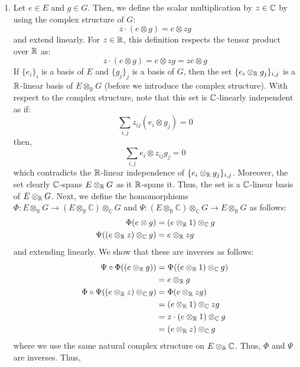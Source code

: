 \documentclass[12pt]{article}
\begin{document}
\begin{solu}
    \bbni
    \begin{enumerate}
        \item Let $e \in E$ and $g \in G$. Then, we define the scalar multiplication by $z \in \mathbb C$ by using the complex structure of $G$: 
        \[ z\cdot (e \otimes g) = e \otimes zg \]
        and extend linearly. For $z \in \mathbb R$, this definition respects the tensor product over $\mathbb R$ as:
        \[ z \cdot (e \otimes g ) = e \otimes zg = ze \otimes g\]
        If $\{e_i\}_i$ is a basis of $E$ and $\{g_j\}_j$ is a basis of $G$, then the set $\{e_i \otimes_\mathbb R g_j\}_{i,j}$ is a $\mathbb R$-linear basis of $E \otimes_{\mathbb{R}} G$ (before we introduce the complex structure). With respect to the complex structure, note that this set is $\mathbb C$-linearly independent as if: 
        \[\sum_{i,j} z_{ij} (e_i \otimes g_j)= 0\]
        then, 
        \[ \sum_{i,j}  e_i \otimes z_{ij}g_j = 0\]
        which contradicts the $\mathbb R$-linear independence of $\{e_i \otimes_\mathbb R g_j\}_{i,j}$. Moreover, the set clearly $\mathbb C$-spans $E \otimes_\mathbb R G$ as it $\mathbb R$-spans it. Thus, the set is a $\mathbb C$-linear basis of $E \otimes_\mathbb R G$. \bbni
        Next, we define the homomorphisms $\Phi: E \otimes_{\mathbb{R}} G \to (E \otimes_{\mathbb{R}} \mathbb{C}) \otimes_{\mathbb{C}} G$ and $\Psi: (E \otimes_{\mathbb{R}} \mathbb{C}) \otimes_{\mathbb{C}} G \to E \otimes_{\mathbb{R}} G$ as follows:
        \begin{align*}
            \Phi(e \otimes g) &= (e \otimes_\mathbb R 1) \otimes_\mathbb C g \\
            \Psi((e \otimes_\mathbb R z) \otimes_\mathbb C g) &= e \otimes_\mathbb R zg
        \end{align*}
        and extending linearly. We show that these are inverses as follows: 
        \begin{align*}
            \Psi \circ \Phi((e \otimes_\mathbb R g)) &= \Psi((e \otimes_\mathbb R 1) \otimes_\mathbb C g) \\
            &= e \otimes_\mathbb R g \\
            \Phi \circ \Psi((e \otimes_\mathbb R z) \otimes_\mathbb C g) &= \Phi(e \otimes_\mathbb R zg) \\
            &= (e \otimes_\mathbb R 1) \otimes_\mathbb C zg \\
            &= z\cdot (e \otimes_\mathbb R 1) \otimes_\mathbb C g \\
            &= (e \otimes_\mathbb R z) \otimes_\mathbb C g
        \end{align*}
        where we use the same natural complex structure on $E \otimes_\mathbb R \mathbb C$. Thus, $\Phi$ and $\Psi$ are inverses. Thus, 

\end{enumerate}
\end{solu}
\end{document}
